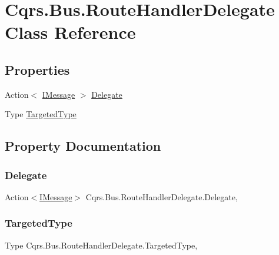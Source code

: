\hypertarget{classCqrs_1_1Bus_1_1RouteHandlerDelegate}{}\section{Cqrs.\+Bus.\+Route\+Handler\+Delegate Class Reference}
\label{classCqrs_1_1Bus_1_1RouteHandlerDelegate}
\subsection*{Properties}
\begin{DoxyCompactItemize}
\item 
Action$<$ \hyperlink{interfaceCqrs_1_1Messages_1_1IMessage}{I\+Message} $>$ \hyperlink{classCqrs_1_1Bus_1_1RouteHandlerDelegate_acf8ba9d433498b2c49bc556cef3a7512_acf8ba9d433498b2c49bc556cef3a7512}{Delegate}
\item 
Type \hyperlink{classCqrs_1_1Bus_1_1RouteHandlerDelegate_a2acba9d07b00b0d52290b3b7839a4eb2_a2acba9d07b00b0d52290b3b7839a4eb2}{Targeted\+Type}
\end{DoxyCompactItemize}


\subsection{Property Documentation}
\mbox{\label{classCqrs_1_1Bus_1_1RouteHandlerDelegate_acf8ba9d433498b2c49bc556cef3a7512_acf8ba9d433498b2c49bc556cef3a7512}} 
\subsubsection{\texorpdfstring{Delegate}{Delegate}}
{\footnotesize\ttfamily Action$<$\hyperlink{interfaceCqrs_1_1Messages_1_1IMessage}{I\+Message}$>$ Cqrs.\+Bus.\+Route\+Handler\+Delegate.\+Delegate\hspace{0.3cm}{\ttfamily [get]}, {\ttfamily [set]}}

\mbox{\label{classCqrs_1_1Bus_1_1RouteHandlerDelegate_a2acba9d07b00b0d52290b3b7839a4eb2_a2acba9d07b00b0d52290b3b7839a4eb2}} 
\subsubsection{\texorpdfstring{Targeted\+Type}{TargetedType}}
{\footnotesize\ttfamily Type Cqrs.\+Bus.\+Route\+Handler\+Delegate.\+Targeted\+Type\hspace{0.3cm}{\ttfamily [get]}, {\ttfamily [set]}}

